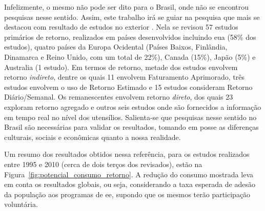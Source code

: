 Infelizmente, o mesmo não pode ser dito para o Brasil, onde não se
encontrou pesquisas nesse sentido. Assim, este trabalho irá se guiar
na pesquisa que mais se destacou com resultado de estudos no exterior
\cite{aceee_2010_estudos_feedback}. Nela se revisou 57 estudos
primários de retorno, realizados em países desenvolvidos incluindo
\gls{eua} (58\% dos estudos), quatro países da Europa Ocidental
(Países Baixos, Finlândia, Dinamarca e Reino Unido, com um total de
22\%), Canada (15\%), Japão (5\%) e Australia (1 estudo). Em termos de
retorno, metade dos estudos envolvem retorno \emph{indireto}, dentre
os quais 11 envolvem Faturamento Aprimorado, três estudos envolvem o
uso de Retorno Estimado e 15 estudos consideram Retorno
Diário/Semanal. Os remanescentes envolvem retorno \emph{direto}, dos
quais 23 exploram retorno agregado e outros seis estudos onde são
fornecidos a informação em tempo real no nível dos utensílios.
Salienta-se que pesquisas nesse sentido no Brasil são necessárias para
validar os resultados, tomando em posse as diferenças culturais,
sociais e econômicas quanto a nossa realidade.



Um resumo dos resultados obtidos nessa referência, para os estudos realizados entre 1995 e 
2010 (cerca de dois terços dos revisados), estão na Figura~\ref{fig:potencial_consumo_retorno}. 
A redução do consumo mostrada leva em conta os
resultados globais, ou seja, considerando a taxa esperada de adesão da população aos
programas de \gls{ee}, supondo que os mesmos terão participação voluntária. 

